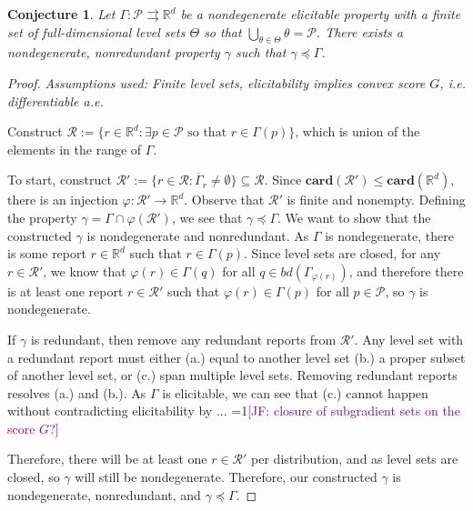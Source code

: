 \documentclass[12pt]{article}
\newcommand{\Comments}{1}
\newcommand{\mynote}[2]{\ifnum\Comments=1\textcolor{#1}{#2}\fi}
\newcommand{\jessie}[1]{\mynote{purple}{[JF: #1]}}
\newcommand{\reals}{\mathbb{R}}
\renewcommand{\P}{\mathcal{P}}
\newcommand{\R}{\mathcal{R}}
\newcommand{\inter}[1]{\mathring{#1}}%
\newcommand{\toto}{\rightrightarrows}
\newcommand{\card}{\textbf{card}}
\newtheorem{conjecture}{Conjecture}
\begin{document}
\begin{conjecture}\label{conj:gam-prime-exists}
	Let $\Gamma:\P \toto \reals^d$ be a nondegenerate elicitable property with a finite set of full-dimensional level sets $\Theta$ so that $\bigcup_{\theta \in \Theta}\theta = \P$.
	There exists a nondegenerate, nonredundant property $\gamma$ such that $\gamma \preceq \Gamma$. 
\end{conjecture}
\begin{proof}
\emph{Assumptions used: Finite level sets, elicitability implies convex score $G$, i.e. differentiable 	a.e.}

	Construct $\R := \{ r \in \reals^d : \exists p \in \P \text{ so that } r \in \Gamma(p) \}$, which is union of the elements in the range of $\Gamma$.
	
	To start, construct $\R' := \{ r \in \R : \inter{\Gamma_r} \neq \emptyset \} \subseteq \R$.
	Since $\card(\R') \leq \card(\reals^d)$, there is an injection $\varphi:\R' \to \reals^d$.
	Observe that $\R'$ is finite and nonempty.
	Defining the property $\gamma = \Gamma\cap \varphi(\R')$, we see that $\gamma \preceq \Gamma$.
	We want to show that the constructed $\gamma$ is nondegenerate and nonredundant.
	As $\Gamma$ is nondegenerate, there is some report $r \in \reals^d$ such that $r \in \Gamma(p)$.
	Since level sets are closed, for any $r \in \R'$, we know that $\varphi(r) \in \Gamma(q)$ for all $q \in bd(\Gamma_{\varphi(r)})$, and therefore there is at least one report $r \in \R'$ such that $\varphi(r) \in \Gamma(p)$ for all $p \in \P$, so $\gamma$ is nondegenerate. 

	If $\gamma$ is redundant, then remove any redundant reports from $\R'$.
	Any level set with a redundant report must either (a.) equal to another level set (b.) a proper subset of another level set, or (c.) span multiple level sets.
	Removing redundant reports resolves (a.) and (b.).
	As $\Gamma$ is elicitable, we can see that (c.) cannot happen without contradicting elicitability by ... \jessie{closure of subgradient sets on the score $G$?} 
	
	Therefore, there will be at least one $r \in \R'$ per distribution, and as level sets are closed, so $\gamma$ will still be nondegenerate.
	Therefore, our constructed $\gamma$ is nondegenerate, nonredundant, and $\gamma \preceq \Gamma$.
	
	

\end{proof}
\end{document}
